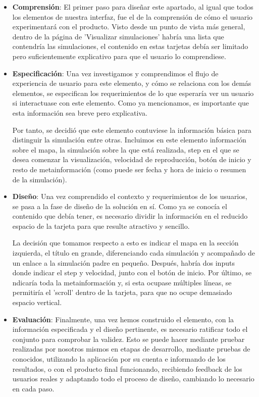 \begin{itemize}
	
	\item \textbf{Comprensión}: El primer paso para diseñar este apartado, al igual que todos los elementos de nuestra interfaz, fue el de la comprensión de cómo el usuario experimentará con el producto. Visto desde un punto de vista más general, dentro de la página de 'Visualizar simulaciones' habría una lista que contendría las simulaciones, el contenido en estas tarjetas debía ser limitado pero suficientemente explicativo para que el usuario lo comprendiese.
	
	\item \textbf{Especificación}: Una vez investigamos y comprendimos el flujo de experiencia de usuario para este elemento, y cómo se relaciona con  los demás elementos, se especifican los requerimientos de lo que esperaría ver un usuario si interactuase con este elemento. Como ya mencionamos, es importante que esta información sea breve pero explicativa.
		
	Por tanto, se decidió que este elemento contuviese la información básica para distinguir la simulación entre otras. Incluimos en este elemento información sobre el mapa, la simulación sobre la que está realizada, step en el que se desea comenzar la visualización, velocidad de reproducción, botón de inicio y resto de metainformación (como puede ser fecha y hora de inicio o resumen de la simulación).
	
	\item \textbf{Diseño}: Una vez comprendido el contexto y requerimientos de los usuarios, se pasa a la fase de diseño de la solución en sí. Como ya se conocía el contenido que debía tener, es necesario dividir la información en el reducido espacio de la tarjeta para que resulte atractivo y sencillo.
	
	La decisión que tomamos respecto a esto es indicar el mapa en la sección izquierda, el título en grande, diferenciando cada simulación y acompañado de un enlace a la simulación padre en pequeño. Después, habría dos inputs donde indicar el step y velocidad, junto con el botón de inicio. Por último, se ndicaría toda la metainformación y, si esta ocupase múltiples líneas, se permitiría el 'scroll' dentro de la tarjeta, para que no ocupe demasiado espacio vertical.
	
	\item \textbf{Evaluación}: Finalmente, una vez hemos construido el elemento, con la información especificada y el diseño pertinente, es necesario ratificar todo el conjunto para comprobar la validez. Esto se puede hacer mediante pruebar realizadas por nosotros mismos en etapas de desarrollo, mediante pruebas de conocidos, utilizando la aplicación por su cuenta e informando de los resultados, o con el producto final funcionando, recibiendo feedback de los usuarios reales y adaptando todo el proceso de diseño, cambiando lo necesario en cada paso.
	
\end{itemize}

